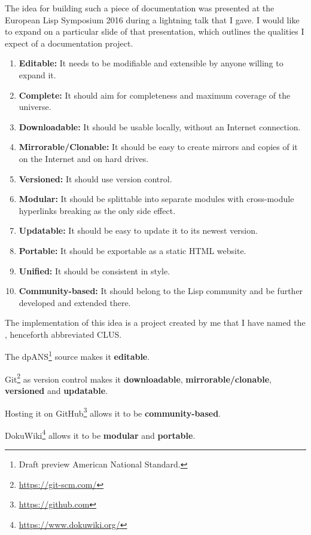 The idea for building such a piece of documentation was presented at the European Lisp Symposium 2016 during a lightning talk\cite{els:2016:clus} that I gave. I would like to expand on a particular slide of that presentation, which outlines the qualities I expect of a \cl{} documentation project.
\begin{enumerate}
\item \textbf{Editable:}
It needs to be modifiable and extensible by anyone willing to expand it.
\item \textbf{Complete:}
It should aim for completeness and maximum coverage of the \cl{} universe.
\item \textbf{Downloadable:}
It should be usable locally, without an Internet connection.
\item \textbf{Mirrorable/Clonable:}
It should be easy to create mirrors and copies of it on the Internet and on hard drives.
\item \textbf{Versioned:}
It should use version control.
\item \textbf{Modular:}
It should be splittable into separate modules with cross-module hyperlinks breaking as the only side effect.
\item \textbf{Updatable:}
It should be easy to update it to its newest version.
\item \textbf{Portable:}
It should be exportable as a static HTML website.
\item \textbf{Unified:}
It should be consistent in style.
\item \textbf{Community-based:}
It should belong to the Lisp community and be further developed and extended there.
\end{enumerate}

The implementation of this idea is a project created by me that I have named the \cl{} \us{}, henceforth abbreviated CLUS.

The dpANS\footnote{Draft preview American National Standard.} source\cite{ANSI:1994:draft} makes it \textbf{editable}.

Git\footnote{\url{https://git-scm.com/}} as version control makes it \textbf{downloadable}, \textbf{mirrorable/clonable}, \textbf{versioned} and \textbf{updatable}.

Hosting it on GitHub\footnote{\url{https://github.com}} allows it to be \textbf{community-based}.

DokuWiki\footnote{\url{https://www.dokuwiki.org/}} allows it to be \textbf{modular} and \textbf{portable}.

